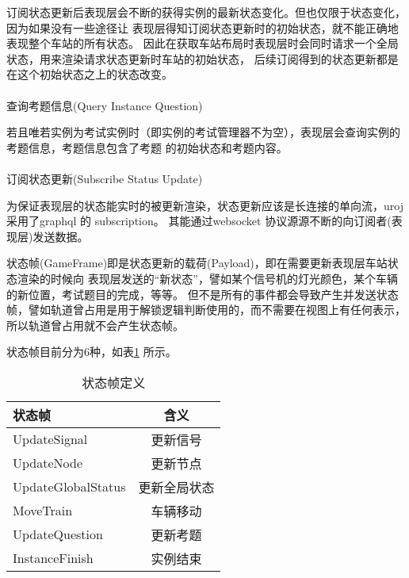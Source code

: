 订阅状态更新后表现层会不断的获得实例的最新状态变化。但也仅限于状态变化，因为如果没有一些途径让
表现层得知订阅状态更新时的初始状态，就不能正确地表现整个车站的所有状态。
因此在获取车站布局时表现层时会同时请求一个全局状态，用来渲染请求状态更新时车站的初始状态，
后续订阅得到的状态更新都是在这个初始状态之上的状态改变。


\paragraph{}查询考题信息(Query Instance Question)

若且唯若实例为考试实例时（即实例的考试管理器不为空），表现层会查询实例的考题信息，考题信息包含了考题
的初始状态和考题内容。

\paragraph{}订阅状态更新(Subscribe Status Update)

为保证表现层的状态能实时的被更新渲染，状态更新应该是长连接的单向流，uroj采用了graphql 的 subscription。
其能通过websocket 协议源源不断的向订阅者(表现层)发送数据。

状态帧(GameFrame)即是状态更新的载荷(Payload)，即在需要更新表现层车站状态渲染的时候向
表现层发送的“新状态”，譬如某个信号机的灯光颜色，某个车辆的新位置，考试题目的完成，等等。
但不是所有的事件都会导致产生并发送状态帧，譬如轨道曾占用是用于解锁逻辑判断使用的，而不需要在视图上有任何表示，
所以轨道曾占用就不会产生状态帧。

状态帧目前分为6种，如表\ref{gameframe} 所示。

\begin{table}
    \centering
    \caption{\label{gameframe} 状态帧定义}
    \begin{tabular}{lc}
        \toprule
        状态帧             & 含义         \\
        \midrule
        UpdateSignal       & 更新信号     \\
        UpdateNode         & 更新节点     \\
        UpdateGlobalStatus & 更新全局状态 \\
        MoveTrain          & 车辆移动     \\
        UpdateQuestion     & 更新考题     \\
        InstanceFinish     & 实例结束     \\
        \bottomrule
    \end{tabular}
\end{table}


